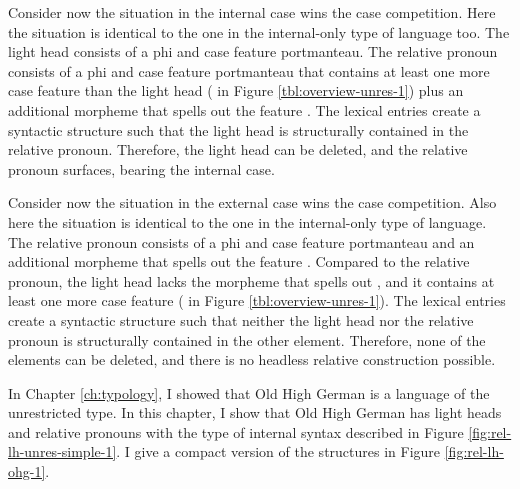 Consider now the situation in the internal case wins the case competition. Here the situation is identical to the one in the internal-only type of language too. The light head consists of a phi and case feature portmanteau. The relative pronoun consists of a phi and case feature portmanteau that contains at least one more case feature than the light head ( in Figure \ref{tbl:overview-unres-1}) plus an additional morpheme that spells out the feature . The lexical entries create a syntactic structure such that the light head is structurally contained in the relative pronoun. Therefore, the light head can be deleted, and the relative pronoun surfaces, bearing the internal case.

Consider now the situation in the external case wins the case competition. Also here the situation is identical to the one in the internal-only type of language. The relative pronoun consists of a phi and case feature portmanteau and an additional morpheme that spells out the feature . Compared to the relative pronoun, the light head lacks the morpheme that spells out , and it contains at least one more case feature ( in Figure \ref{tbl:overview-unres-1}). The lexical entries create a syntactic structure such that neither the light head nor the relative pronoun is structurally contained in the other element. Therefore, none of the elements can be deleted, and there is no headless relative construction possible.

In Chapter \ref{ch:typology}, I showed that Old High German is a language of the unrestricted type. In this chapter, I show that Old High German has light heads and relative pronouns with the type of internal syntax described in Figure \ref{fig:rel-lh-unres-simple-1}. I give a compact version of the structures in Figure \ref{fig:rel-lh-ohg-1}.

